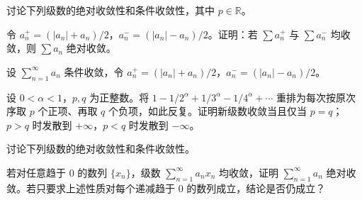 \noindent\begin{minipage}{\textwidth}
讨论下列级数的绝对收敛性和条件收敛性，其中 $p\in\mathbb R$。
\end{minipage}\par\vfill
\noindent\begin{minipage}{\textwidth}
令 $a_n^+=(|a_n|+a_n)/2$，$a_n^-=(|a_n|-a_n)/2$。证明：若 $\sum a_n^+$ 与 $\sum a_n^-$ 均收敛，则 $\sum a_n$ 绝对收敛。
\end{minipage}\par\vfill
\newpage
\noindent\begin{minipage}{\textwidth}
设 $\sum_{n=1}^{\infty}a_n$ 条件收敛，令 $a_n^+=(|a_n|+a_n)/2$，$a_n^-=(|a_n|-a_n)/2$。
\end{minipage}\par\vfill
\noindent\begin{minipage}{\textwidth}
设 $0<\alpha<1$，$p,q$ 为正整数。将 $1-1/2^\alpha+1/3^\alpha-1/4^\alpha+\cdots$ 重排为每次按原次序取 $p$ 个正项、再取 $q$ 个负项，如此反复。证明新级数收敛当且仅当 $p=q$；$p>q$ 时发散到 $+\infty$，$p<q$ 时发散到 $-\infty$。
\end{minipage}\par\vfill
\noindent\begin{minipage}{\textwidth}
讨论下列级数的绝对收敛性和条件收敛性。
\end{minipage}\par\vfill
\newpage
\noindent\begin{minipage}{\textwidth}
若对任意趋于 $0$ 的数列 $\{x_n\}$，级数 $\sum_{n=1}^{\infty}a_nx_n$ 均收敛，证明 $\sum_{n=1}^{\infty}a_n$ 绝对收敛。若只要求上述性质对每个递减趋于 $0$ 的数列成立，结论是否仍成立？
\end{minipage}\par\vfill
